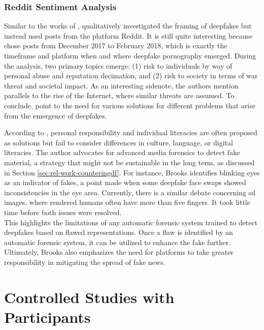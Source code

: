 \documentclass[
  a4paper,  %
  twoside,  %
  bibliography=totoc,
  headsepline,
  cleardoublepage=empty,
  parskip=half,
  draft=false
]{scrbook}
\begin{document}
\subsubsection*{Reddit Sentiment Analysis}
Similar to the works of \citeauthor{leeBelieveNotBelieve2021}, \citeauthor{brooksPopularDiscourseDeepfakes2021} qualitatively investigated the framing of deepfakes but instead used posts from the platform Reddit. It is still quite interesting because \citeauthor{brooksPopularDiscourseDeepfakes2021} chose posts from December 2017 to February 2018, which is exactly the timeframe and platform when and where deepfake pornography emerged. During the analysis, two primary topics emerge: (1) risk to individuals by way of personal abuse and reputation decimation, and (2) risk to society in terms of war threat and societal impact. As an interesting sidenote, the authors mention parallels to the rise of the Internet, where similar threats are assumed. To conclude, \citeauthor{brooksPopularDiscourseDeepfakes2021} point to the need for various solutions for different problems that arise from the emergence of deepfakes.

According to \citeauthor{brooksPopularDiscourseDeepfakes2021}, personal responsibility and individual literacies are often proposed as solutions but fail to consider differences in culture, language, or digital literacies. The author advocates for advanced media forensics to detect fake material, a strategy that might not be sustainable in the long term, as discussed in Section \ref{sec:rel-work-counteringdf}. For instance, Brooks identifies blinking eyes as an indicator of fakes, a point made when some deepfake face swaps showed inconsistencies in the eye area. Currently, there is a similar debate concerning \gls{sd} images, where rendered humans often have more than five fingers. It took little time before both issues were resolved.\\
This highlights the limitations of any automatic forensic system trained to detect deepfakes based on flawed representations. Once a flaw is identified by an automatic forensic system, it can be utilized to enhance the fake further. Ultimately, Brooks also emphasizes the need for platforms to take greater responsibility in mitigating the spread of fake news.

\section{Controlled Studies with Participants}
\label{sec:rel-studypart}
\end{document}
